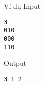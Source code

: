 Ví dụ
Input
\begin{verbatim}
3
010
000
110\end{verbatim}

Output
\begin{verbatim}
3 1 2\end{verbatim}